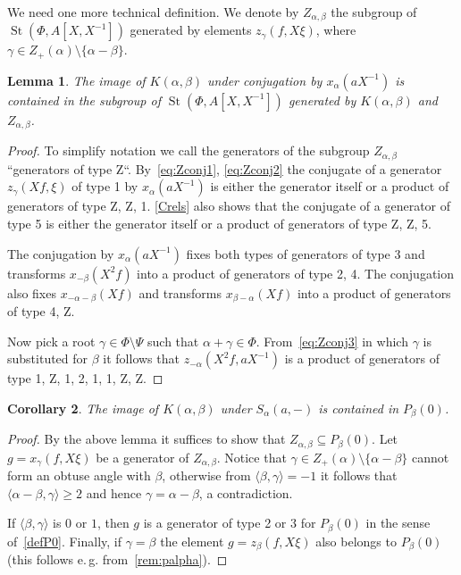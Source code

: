 \documentclass[oneside, 8pt]{amsart}
\newtheorem{lemma}{Lemma}
\newtheorem{corollary}[lemma]{Corollary}
\theoremstyle{remark}
\theoremstyle{definition}
\numberwithin{lemma}{section}
\numberwithin{prop}{section}
\numberwithin{corollary}{section}
\numberwithin{externaltheorem}{section}
\DeclareMathOperator{\St}{St}
\numberwithin{equation}{section}
\begin{document}
We need one more technical definition. We denote by $Z_{\alpha, \beta}$ the subgroup of $\St(\Phi, A[X, X^{-1}])$ generated by elements $z_\gamma(f, X\xi)$, where $\gamma \in Z_+(\alpha) \setminus \{ \alpha - \beta \}$.
  
\begin{lemma} \label{image-K-a-b} The image of $K(\alpha, \beta)$ under conjugation by $x_\alpha(aX^{-1})$ is contained in the subgroup of $\St(\Phi, A[X, X^{-1}])$ generated by $K(\alpha, \beta)$ and $Z_{\alpha, \beta}$. \end{lemma}
\begin{proof} To simplify notation we call the generators of the subgroup $Z_{\alpha,\beta}$ ``generators of type Z``. By~\eqref{eq:Zconj1}, \eqref{eq:Zconj2} the conjugate of a generator $z_\gamma(Xf, \xi)$ of type 1 by $x_\alpha(aX^{-1})$ is either the generator itself or a product of generators of type Z, Z, 1. \cref{Crels} also shows that the conjugate of a generator of type 5 is either the generator itself or a product of generators of type Z, Z, 5.

The conjugation by $x_\alpha(aX^{-1})$ fixes both types of generators of type 3 and transforms $x_{-\beta}(X^2f)$ into a product of generators of type 2, 4. The conjugation also fixes $x_{-\alpha-\beta}(Xf)$ and transforms $x_{\beta-\alpha}(Xf)$ into a product of generators of type 4, Z.

Now pick a root $\gamma \in \Phi \setminus \Psi$ such that $\alpha + \gamma \in \Phi$.
From~\eqref{eq:Zconj3} in which $\gamma$ is substituted for $\beta$ it follows that  $z_{-\alpha}(X^2f, aX^{-1})$ is a product of generators of type 1, Z, 1, 2, 1, 1, Z, Z\@.
\end{proof}  

\begin{corollary} The image of $K(\alpha, \beta)$ under $S_\alpha(a, -)$ is contained in $P_\beta(0)$. \end{corollary}
\begin{proof} 
By the above lemma it suffices to show that $Z_{\alpha, \beta} \subseteq P_\beta(0)$.
Let $g = x_{\gamma}(f, X\xi)$ be a generator of $Z_{\alpha, \beta}$.
Notice that $\gamma \in Z_+(\alpha) \setminus \{\alpha - \beta \}$ cannot form an obtuse angle with $\beta$, otherwise from $\langle \beta, \gamma \rangle = -1$ it follows that $ \langle \alpha - \beta, \gamma \rangle \geq 2$ and hence $\gamma = \alpha - \beta$, a contradiction.

If $\langle \beta, \gamma \rangle$ is $0$ or $1$, then $g$ is a generator of type 2 or 3 for $P_\beta(0)$ in the sense of~\cref{defP0}. Finally, if $\gamma = \beta$ the element $g = z_\beta(f, X\xi)$ also belongs to $P_\beta(0)$ (this follows e.\,g. from~\cref{rem:palpha}). \end{proof}
\end{document}
